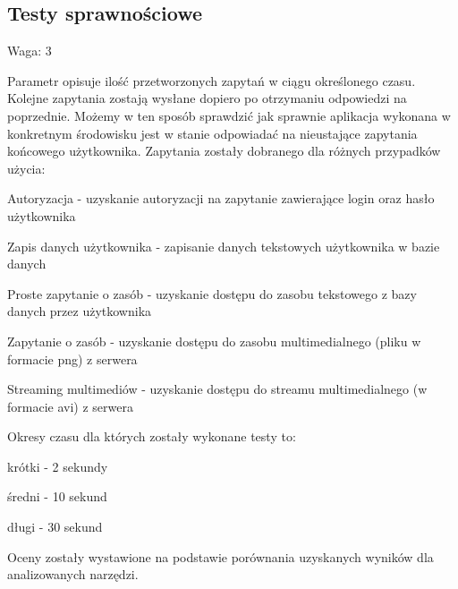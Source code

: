 \documentclass[12pt]{report}
\begin{document}
    \subsection{Testy sprawnościowe}
      \begin{description}
        \item Waga: 3
      \end{description}
      Parametr opisuje ilość przetworzonych zapytań w ciągu określonego czasu.
      Kolejne zapytania zostają wysłane dopiero po otrzymaniu odpowiedzi na poprzednie.
      Możemy w ten sposób sprawdzić jak sprawnie aplikacja wykonana w konkretnym środowisku jest w stanie odpowiadać na nieustające zapytania końcowego użytkownika.
      Zapytania zostały dobranego dla różnych przypadków użycia:
      \begin{description}
        \item Autoryzacja - uzyskanie autoryzacji na zapytanie zawierające login oraz hasło użytkownika
        \item Zapis danych użytkownika - zapisanie danych tekstowych użytkownika w bazie danych
        \item Proste zapytanie o zasób - uzyskanie dostępu do zasobu tekstowego z bazy danych przez użytkownika
        \item Zapytanie o zasób - uzyskanie dostępu do zasobu multimedialnego (pliku w formacie png) z serwera
        \item Streaming multimediów - uzyskanie dostępu do streamu multimedialnego (w formacie avi) z serwera
      \end{description}
      Okresy czasu dla których zostały wykonane testy to:
      \begin{description}
        \item krótki - 2 sekundy
        \item średni - 10 sekund
        \item długi - 30 sekund
      \end{description}
      Oceny zostały wystawione na podstawie porównania uzyskanych wyników dla analizowanych narzędzi.
      
\end{document}
